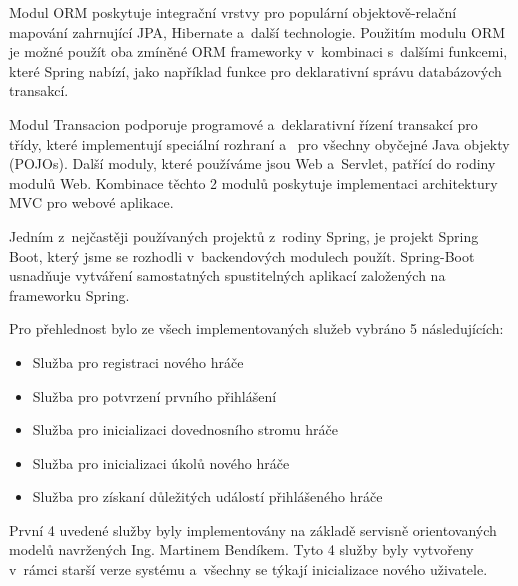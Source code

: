 \documentclass[12pt]{article}
\begin{document}
{%
Modul ORM poskytuje integrační vrstvy pro populární objektově-relační mapování
zahrnující JPA, Hibernate a~další technologie.
Použitím modulu ORM je možné použít oba zmíněné ORM frameworky 
v~kombinaci s~dalšími funkcemi, které Spring nabízí, 
jako například funkce pro deklarativní správu databázových transakcí.

Modul Transacion podporuje programové a~deklarativní řízení
transakcí pro třídy, které implementují speciální rozhraní a~
pro všechny obyčejné Java objekty (POJOs).
Další moduly, které používáme jsou Web a~Servlet, patřící do rodiny modulů Web.
Kombinace těchto 2 modulů poskytuje implementaci architektury MVC
pro webové aplikace. 


Jedním z~nejčastěji používaných projektů z~rodiny Spring,
je projekt Spring Boot, který jsme se rozhodli v~backendových modulech použít.
Spring-Boot usnadňuje vytváření samostatných spustitelných aplikací
založených na frameworku Spring.





Pro přehlednost bylo ze všech implementovaných služeb vybráno 5 následujících:

\begin{itemize}
\item Služba pro registraci nového hráče
\item Služba pro potvrzení prvního přihlášení
\item Služba pro inicializaci dovednosního stromu hráče
\item Služba pro inicializaci úkolů nového hráče
\item Služba pro získaní důležitých událostí přihlášeného hráče
\end{itemize}

První 4 uvedené služby byly implementovány na základě servisně orientovaných modelů navržených Ing. Martinem Bendíkem.
Tyto 4 služby byly vytvořeny v~rámci starší verze systému a~všechny se týkají inicializace nového uživatele.

}
\end{document}
